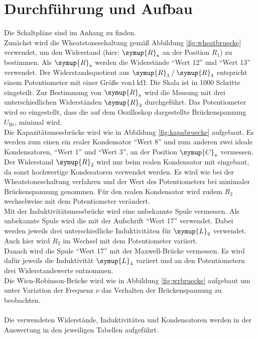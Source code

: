 \section{Durchführung und Aufbau}
\label{sec:Durchführung}
Die Schaltpläne sind im Anhang zu finden.
\\
Zunächst wird die Wheatstoneschaltung gemäß Abbildung \ref{fig:wheatbruecke}
verwendet, um den Widerstand (hier: $\symup{R}_\text{x}$ an der Position $R_1$) zu bestimmen. Als
$\symup{R}_\text{x}$ werden die Widerstände \enquote{Wert 12} und \enquote{Wert 13} verwendet. Der Widerstandsquotient aus
$\symup{R}_\text{3}\:/\:\symup{R}_\text{4}$ entspricht einem Potentiometer
mit einer Größe von$\SI{1}{\kilo\ohm}$. Die Skala ist in 1000 Schritte eingeteilt.
Zur Bestimmung von $\symup{R}_\text{x}$ wird die Messung mit drei
unterschiedlichen Widerständen $\symup{R}_2$ durchgeführt.
Das Potentiometer wird so eingestellt, dass die auf dem Oszilloskop
dargestellte Brückenspannung $U_\text{Br}$, minimal wird.
\\
Die Kapazitätsmessbrücke wird wie in Abbildung \ref{fig:kapabruecke}
aufgebaut. Es werden zum einen ein realer Kondensator \enquote{Wert 8} und zum
anderen zwei ideale Kondensatoren, \enquote{Wert 1} und \enquote{Wert 3}, an der Position $\symup{C}_\text{x}$ vermessen.
Der Widerstand $\symup{R}_\text{2}$ wird nur beim realen Kondensator mit eingebaut, da sonst
hochwertige Kondesatoren verwendet werden.
Es wird wie bei der Wheatstoneschaltung verfahren und der Wert des
Potentiometers bei minimaler Brückenspannung genommen.
Für den realen Kondensator wird zudem $R_2$ wechselweise mit dem Potentiometer verändert.
\\
Mit der Induktivitätsmessbrücke wird eine unbekannte Spule vermessen.
Als unbekannte Spule wird die mit der Aufschrift \enquote{Wert 17} verwendet.
Dabei werden jeweils drei unterschiedliche Induktivitäten für $\symup{L}_2$
verwendet. Auch hier wird $R_2$ im Wechsel mit dem Potentiometer variiert.
\\
Danach wird die Spule \enquote{Wert 17} mit der Maxwell-Brücke
vermessen. Es wird dafür jeweils die Induktivität $\symup{L}_4$ variiert und
an den Potentiometern drei Widerstandswerte entnommen.
\\
Die Wien-Robinson-Brücke wird wie in Abbildung
\ref{fig:wrbruecke} aufgebaut um unter Variation der Frequenz $ν$ das
Verhalten der Brückenspannung zu beobachten.
\\
\\
Die verwendeten Widerstände, Induktivitäten und Kondensatoren werden in der
Auswertung in den jeweiligen Tabellen aufgeführt.
